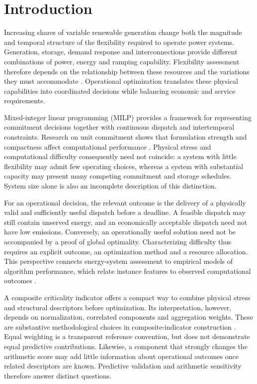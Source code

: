 \section{Introduction}
Increasing shares of variable renewable generation change both the magnitude
and temporal structure of the flexibility required to operate power systems.
Generation, storage, demand response and interconnections provide different
combinations of power, energy and ramping capability. Flexibility assessment
therefore depends on the relationship between these resources and the
variations they must accommodate \citep{lannoye2012,ulbig2015}. Operational
optimization translates these physical capabilities into coordinated decisions
while balancing economic and service requirements.

Mixed-integer linear programming (MILP) provides a framework for representing
commitment decisions together with continuous dispatch and intertemporal
constraints. Research on unit commitment shows that formulation strength and
compactness affect computational performance \citep{moralesespana2013}.
Physical stress and computational difficulty consequently need not coincide:
a system with little flexibility may admit few operating choices, whereas a
system with substantial capacity may present many competing commitment and
storage schedules. System size alone is also an incomplete description of
this distinction.

For an operational decision, the relevant outcome is the delivery of a
physically valid and sufficiently useful dispatch before a deadline. A
feasible dispatch may still contain unserved energy, and an economically
acceptable dispatch need not have low emissions. Conversely, an operationally
useful solution need not be accompanied by a proof of global optimality.
Characterizing difficulty thus requires an explicit outcome, an optimization
method and a resource allocation. This perspective connects energy-system
assessment to empirical models of algorithm performance, which relate
instance features to observed computational outcomes \citep{hutter2013}.

A composite criticality indicator offers a compact way to combine physical
stress and structural descriptors before optimization. Its interpretation,
however, depends on normalization, correlated components and aggregation
weights. These are substantive methodological choices in composite-indicator
construction \citep{oecd2008}. Equal weighting is a transparent reference
convention, but does not demonstrate equal predictive contributions. Likewise,
a component that strongly changes the arithmetic score may add little
information about operational outcomes once related descriptors are known.
Predictive validation and arithmetic sensitivity therefore answer distinct
questions.

